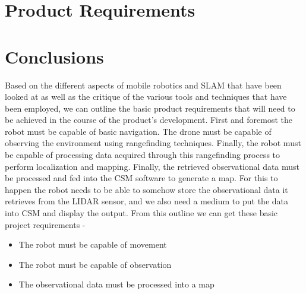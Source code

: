		\chapter{Product Requirements}
				
		\chapter{Conclusions}
		Based on the different aspects of mobile robotics and SLAM that have been looked at as well as the critique of the various tools and techniques that have been employed, we can outline the basic product requirements that will need to be achieved in the course of the product's development. First and foremost the robot must be capable of basic navigation. The drone must be capable of observing the environment using rangefinding techniques. Finally, the robot must be capable of processing data acquired through this rangefinding process to perform localization and mapping. Finally, the retrieved observational data must be processed and fed into the CSM software to generate a map. For this to happen the robot needs to be able to somehow store the observational data it retrieves from the LIDAR sensor, and we also need a medium to put the data into CSM and display the output. From this outline we can get these basic project requirements -
		
		\begin{itemize}
			\item The robot must be capable of movement
			\item The robot must be capable of observation
			\item The observational data must be processed into a map
		\end{itemize}
	
	
	
		
				
	
